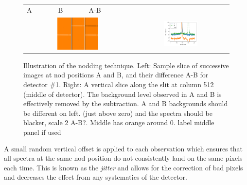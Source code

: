 \begin{figure}
    \centering

      \begin{tabularx}{0.75\textwidth}{|*6{Y|}|}    %
      A & B & A-B& & & \\
         &
        \\
    \end{tabularx}
    \caption{Illustration of the nodding technique. Left: Sample slice of successive images at nod positions A and B, and their difference A-B for detector \#1. Right: A vertical slice along the slit at column 512 (middle of detector). The background level observed in A and B is effectively removed by the subtraction. {\red{} A and B backgrounds should be different on left. (just above zero) and the spectra should be blacker, scale 2 A-B?}. Middle has orange around 0. {\red{} label middle panel if used}}
    \label{fig:nodimages}
\end{figure}

A small random vertical offset is applied to each observation which ensures that all spectra at the same nod position do not consistently land on the same pixels each time. This is known as the \emph{jitter} and allows for the correction of bad pixels and decreases the effect from any systematics of the detector.

